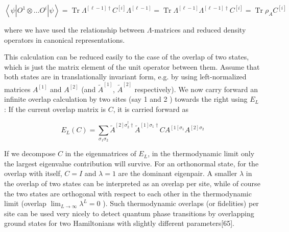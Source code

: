 \documentclass[12pt]{article}
\begin{document}
\begin{equation*}
\left\langle\psi\left|O^{1} \otimes \ldots O^{i}\right| \psi\right\rangle=\operatorname{Tr} \Lambda^{[\ell-1] \dagger} C^{[i]} \Lambda^{[\ell-1]}=\operatorname{Tr} \Lambda^{[\ell-1]} \Lambda^{[\ell-1] \dagger} C^{[i]}=\operatorname{Tr} \rho_{A} C^{[i]} \tag{360}
\end{equation*}


where we have used the relationship between $\Lambda$-matrices and reduced density operators in canonical representations.

This calculation can be reduced easily to the case of the overlap of two states, which is just the matrix element of the unit operator between them. Assume that both states are in translationally invariant form, e.g. by using left-normalized matrices $A^{[1]}$ and $A^{[2]}$ (and $\tilde{A}^{[1]}$, $\tilde{A}^{[2]}$ respectively). We now carry forward an infinite overlap calculation by two sites (say 1 and 2 ) towards the right using $E_{L}$ : If the current overlap matrix is $C$, it is carried forward as


\begin{equation*}
E_{L}(C)=\sum_{\sigma_{1} \sigma_{2}} \tilde{A}^{[2] \sigma_{2}^{\dagger} \dagger} \tilde{A}^{[1] \sigma_{1} \dagger} C A^{\left[1 \left[\sigma_{1}\right.\right.} A^{[2] \sigma_{2}} \tag{361}
\end{equation*}


If we decompose $C$ in the eigenmatrices of $E_{L}$, in the thermodynamic limit only the largest eigenvalue contribution will survive. For an orthonormal state, for the overlap with itself, $C=I$ and $\lambda=1$ are the dominant eigenpair. A smaller $\lambda$ in the overlap of two states can be interpreted as an overlap per site, while of course the two states are orthogonal with respect to each other in the thermodynamic limit (overlap $\lim _{L \rightarrow \infty} \lambda^{L}=0$ ). Such thermodynamic overlaps (or fidelities) per site can be used very nicely to detect quantum phase transitions by overlapping ground states for two Hamiltonians with slightly different parameters[65].
\end{document}
